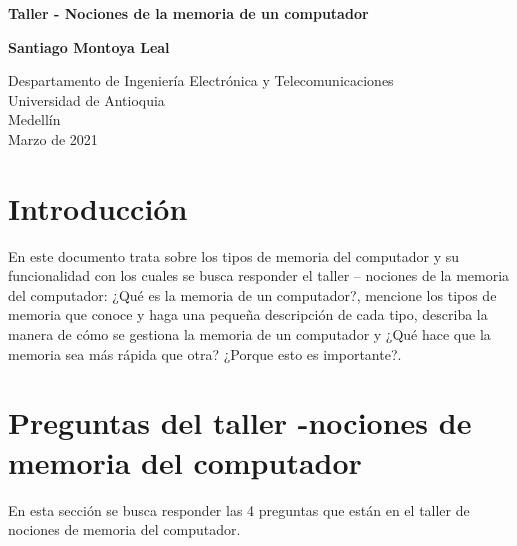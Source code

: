 \documentclass{article}
\begin{document}
\begin{titlepage}
    \begin{center}
        \vspace*{1cm}
            
        \Huge
        \textbf{Taller - Nociones de la memoria de un computador}
            
        \vspace{0.5cm}
        \LARGE
    
            
        \vspace{1.5cm}
            
        \textbf{Santiago Montoya Leal}
            
        \vfill
            
        \vspace{0.8cm}
            
        \Large
        Despartamento de Ingeniería Electrónica y Telecomunicaciones\\
        Universidad de Antioquia\\
        Medellín\\
        Marzo de 2021
            
    \end{center}
\end{titlepage}

\tableofcontents
\newpage
\section{Introducción}\label{intro}
En este documento trata sobre los tipos de memoria del computador y su funcionalidad con los cuales se busca responder el taller – nociones de la memoria del computador: ¿Qué es la memoria de un computador?, mencione los tipos de memoria que conoce y haga una pequeña descripción de cada tipo, describa la manera de cómo se gestiona la memoria de un computador y ¿Qué hace que la memoria sea más rápida que otra? ¿Porque esto es importante?.

\section{Preguntas del taller -nociones de memoria del computador} \label{contenido}
En esta sección se busca responder las 4 preguntas que están en el taller de nociones de memoria del computador.
\end{document}
